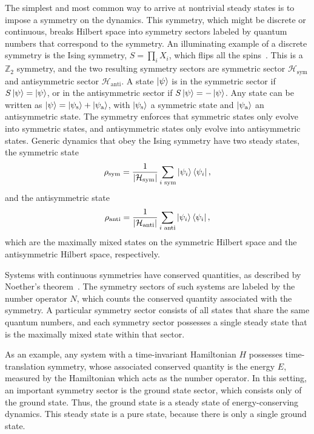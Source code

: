 The simplest and most common way to arrive at nontrivial steady states is to impose a symmetry on the dynamics. This symmetry, which might be discrete or continuous, breaks Hilbert space into symmetry sectors labeled by quantum numbers that correspond to the symmetry. An illuminating example of a discrete symmetry is the Ising symmetry, $S = \prod_i X_i$, which flips all the spins~\cite{Ising1925Contribution}. This is a $\mathbb{Z}_2$ symmetry, and the two resulting symmetry sectors are symmetric sector $\mathcal{H}_\text{sym}$ and antisymmetric sector $\mathcal{H}_\text{anti}$. A state $\ket{\psi}$ is in the symmetric sector if $S\ket{\psi} = \ket{\psi}$, or in the antisymmetric sector if $S\ket{\psi} = -\ket{\psi}$. Any state can be written as $\ket{\psi} = \ket{\psi_\text{s}} + \ket{\psi_\text{a}}$, with $\ket{\psi_\text{s}}$ a symmetric state and $\ket{\psi_\text{a}}$ an antisymmetric state. The symmetry enforces that symmetric states only evolve into symmetric states, and antisymmetric states only evolve into antisymmetric states.
Generic dynamics that obey the Ising symmetry have two steady states, the symmetric state 
\begin{equation}
\rho_\text{sym} = \frac{1}{|\mathcal{H}_\text{sym}|} \sum_{i \text{ sym}} \ket{\psi_i} \bra{\psi_i},
\end{equation}
and the antisymmetric state
\begin{equation}
\rho_\text{anti} = \frac{1}{|\mathcal{H}_\text{anti}|} \sum_{i \text{ anti}} \ket{\psi_i} \bra{\psi_i},
\end{equation}
which are the maximally mixed states on the symmetric Hilbert space and the antisymmetric Hilbert space, respectively.

Systems with continuous symmetries have conserved quantities, as described by Noether's theorem~\cite{Noether1918Theorem}. The symmetry sectors of such systems are labeled by the number operator $N$, which counts the conserved quantity associated with the symmetry. A particular symmetry sector consists of all states that share the same quantum numbers, and each symmetry sector possesses a single steady state that is the maximally mixed state within that sector.

As an example, any system with a time-invariant Hamiltonian $H$ possesses time-translation symmetry, whose associated conserved quantity is the energy $E$, measured by the Hamiltonian which acts as the number operator. In this setting, an important symmetry sector is the ground state sector, which consists only of the ground state. Thus, the ground state is a steady state of energy-conserving dynamics. This steady state is a pure state, because there is only a single ground state.

